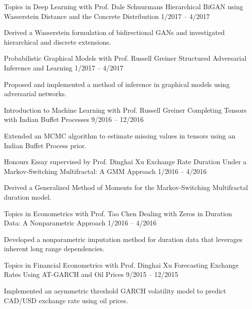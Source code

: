 \begin{cventries}
  \cventry
    {Topics in Deep Learning with Prof. Dale Schuurmans}
    {Hierarchical BiGAN using Wasserstein Distance and
the Concrete Distribution}
    {1/2017 -- 4/2017}
    {
      \begin{cvitems}
        \item Derived a Wasserstein formulation of bidirectional GANs and investigated hierarchical and discrete extensions.
      \end{cvitems}
    }
  \cventry
    {Probabilistic Graphical Models with Prof. Russell Greiner}
    {Structured Adversarial Inference and Learning}
    {1/2017 -- 4/2017}
    {
      \begin{cvitems}
        \item Proposed and implemented a method of inference in graphical models using adversarial networks.
      \end{cvitems}
    }
  \cventry
    {Introduction to Machine Learning with Prof. Russell Greiner}
    {Completing Tensors with Indian Buffet Processes}
    {9/2016 -- 12/2016}
    {
      \begin{cvitems}
		\item Extended an MCMC algorithm to estimate missing values in tensors using an Indian Buffet Process prior.
      \end{cvitems}
    }
  \cventry
    {Honours Essay supervised by Prof. Dinghai Xu}
    {Exchange Rate Duration Under a Markov-Switching Multifractal: A GMM Approach}
    {1/2016 -- 4/2016}
    {
      \begin{cvitems}
      	\item Derived a Generalized Method of Moments for the Markov-Switching Multifractal duration model.
      \end{cvitems}
    }
  \cventry
    {Topics in Econometrics with Prof. Tao Chen}
    {Dealing with Zeros in Duration Data: A Nonparametric Approach}
    {1/2016 -- 4/2016}
    {
      \begin{cvitems}
        \item Developed a nonparametric imputation method for duration data that leverages inherent long range dependencies.
      \end{cvitems}
    }
    \cventry
    {Topics in Financial Econometrics with Prof. Dinghai Xu}
    {Forecasting Exchange Rates Using AT-GARCH and Oil Prices}
    {9/2015 -- 12/2015}
    {
      \begin{cvitems}
        \item Implemented an asymmetric threshold GARCH volatility model to predict CAD/USD exchange rate using oil prices.
      \end{cvitems}
    }
\end{cventries}

